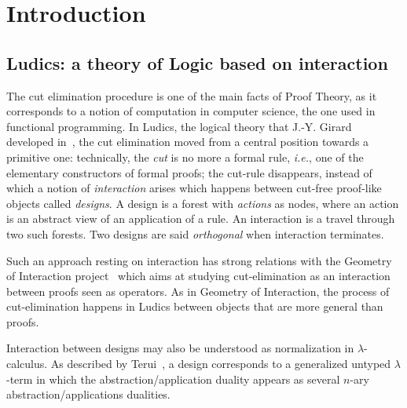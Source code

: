 \documentclass{LMCS}
\def\ie{{\em i.e.}}
\newcommand{\Rouge}[1]{{\color{black}#1}}
\begin{document}
\maketitle\vfill


\section{Introduction}
\Rouge{
\subsection{Ludics: a theory of Logic based on interaction} The cut elimination procedure is one of the main facts of Proof Theory, as it corresponds to a notion of computation in computer science, the one used in functional programming. In Ludics, the logical theory that J.-Y. Girard developed in~\cite{DBLP:journals/mscs/Girard01}, the cut elimination moved from a central position towards a primitive one: technically, the {\it cut} is no more a formal rule, \ie, one of the elementary constructors of formal proofs; the cut-rule disappears, instead of which a notion of {\em interaction} arises which happens between cut-free proof-like objects called {\it designs}. A design is a forest with {\em actions} as nodes, where an action is an abstract view of an application of a rule. An interaction is a travel through two such forests. Two designs are said {\it orthogonal} when interaction terminates.

Such an approach resting on interaction has strong relations with the Geometry of Interaction project~\cite{DBLP:conf/colog/Girard88,towards} which aims at studying cut-elimination as an interaction between proofs seen as operators. As in Geometry of Interaction, the process of cut-elimination happens in Ludics between objects that are more general than proofs.

Interaction between designs may also be understood as normalization in $\lambda$-calculus. As described by Terui~\cite{DBLP:journals/tcs/Terui11}, a design corresponds to a generalized untyped $\lambda$-term in which the abstraction/application duality appears as several $n$-ary abstraction/applications dualities.

}
\end{document}

